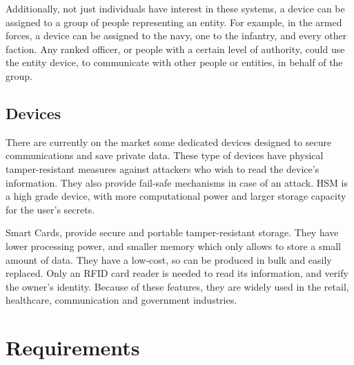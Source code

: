 Additionally, not just individuals have interest in these systems, a device can be assigned to a group of people representing an entity. For example, in the armed forces, a device can be assigned to the navy, one to the infantry, and every other faction. Any ranked officer, or people with a certain level of authority, could use the entity device, to communicate with other people or entities, in behalf of the group.

\subsection{Devices}\label{chap:problem:devices}
There are currently on the market some dedicated devices designed to secure communications and save private data.
These type of devices have physical tamper-resistant measures against attackers who wish to read the device's information. They also provide fail-safe mechanisms in case of an attack.
\ac{HSM} is a high grade device, with more computational power and larger storage capacity for the user's secrets.

Smart Cards, provide secure and portable tamper-resistant storage.
They have lower processing power, and smaller memory which only allows to store a small amount of data.
They have a low-cost, so can be produced in bulk and easily replaced. Only an RFID card reader is needed to read its information, and verify the owner's identity.
Because of these features, they are widely used in the retail, healthcare, communication and government industries.

\section{Requirements}\label{chap:problem:requirements}

